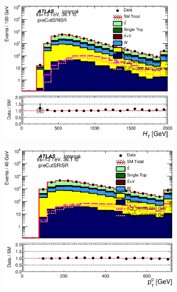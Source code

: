 \begin{figure}[h!]
\begin{center}
    \begin{subfigure}[b]{0.40\textwidth}    
    	 \includegraphics[width=\textwidth]{figures/plotRegion/Ht_preCutSRISR_log.eps}
                \caption{ }
    \end{subfigure}
    \begin{subfigure}[b]{0.40\textwidth}    
    	 \includegraphics[width=\textwidth]{figures/plotRegion/JetPt_0__preCutSRISR_log.eps}
                \caption{ }
    \end{subfigure}
    \begin{subfigure}[b]{0.40\textwidth}    

\end{subfigure}
\end{center}
\end{figure}
